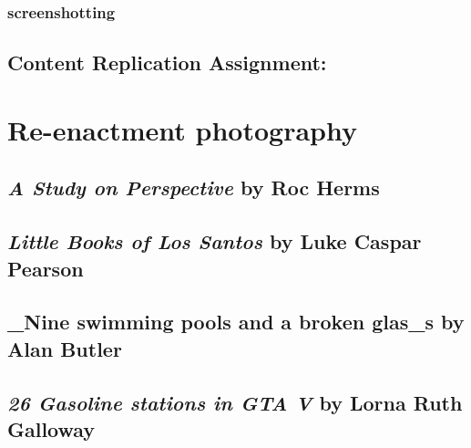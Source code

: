 \documentclass[
  openany]{book}
\begin{document}
\hypertarget{screenshotting}{%
\subsection{screenshotting}\label{screenshotting}}

\hypertarget{content-replication-assignment-1}{%
\section{Content Replication Assignment:}\label{content-replication-assignment-1}}

\hypertarget{re-enactment-photography}{%
\chapter{Re-enactment photography}\label{re-enactment-photography}}

\hypertarget{a-study-on-perspective-by-roc-herms}{%
\section{\texorpdfstring{\emph{A Study on Perspective} by Roc Herms}{A Study on Perspective by Roc Herms}}\label{a-study-on-perspective-by-roc-herms}}

\hypertarget{little-books-of-los-santos-by-luke-caspar-pearson}{%
\section{\texorpdfstring{\emph{Little Books of Los Santos} by Luke Caspar Pearson}{Little Books of Los Santos by Luke Caspar Pearson}}\label{little-books-of-los-santos-by-luke-caspar-pearson}}

\hypertarget{nine-swimming-pools-and-a-broken-glas_s-by-alan-butler}{%
\section{\_Nine swimming pools and a broken glas\_s by Alan Butler}\label{nine-swimming-pools-and-a-broken-glas_s-by-alan-butler}}

\hypertarget{gasoline-stations-in-gta-v-by-lorna-ruth-galloway}{%
\section{\texorpdfstring{\emph{26 Gasoline stations in GTA V} by Lorna Ruth Galloway}{26 Gasoline stations in GTA V by Lorna Ruth Galloway}}\label{gasoline-stations-in-gta-v-by-lorna-ruth-galloway}}
\end{document}
